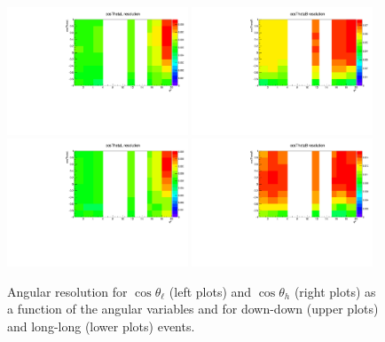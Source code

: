\begin{figure}
\centering
\includegraphics[width=0.48\textwidth]{Lmumu/figs/resolution/resolution2D_cosThetaL_DD.pdf}
\includegraphics[width=0.48\textwidth]{Lmumu/figs/resolution/resolution2D_cosThetaB_DD.pdf} \\
\includegraphics[width=0.48\textwidth]{Lmumu/figs/resolution/resolution2D_cosThetaL_LL.pdf}
\includegraphics[width=0.48\textwidth]{Lmumu/figs/resolution/resolution2D_cosThetaB_LL.pdf}
\caption{Angular resolution for $\cos \theta_\ell$ (left plots) and  $\cos \theta_h$ (right plots)
as a function of the angular variables and \qsq for down-down (upper plots) and long-long (lower plots) events. }
\label{fig:avgResol}
\end{figure}


